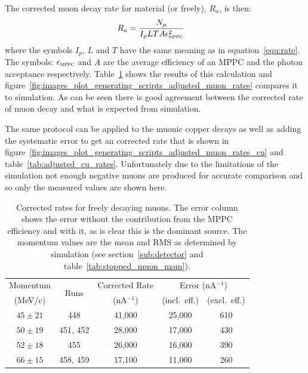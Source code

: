The corrected muon decay rate for material (or freely), \( R_a \), is then:
\begin{align}
    R_a &= \frac{N_{\mu}}{I_p L T A \epsilon_{\textsc{mppc}}^2 } \label{equ:adj_rate}
\end{align}
where the symbols \(I_p\), \(L\) and \(T\) have the same meaning as in equation~\eqref{equ:rate}. The symbols:  \(\epsilon_{\textsc{mppc}}\) and \( A \) are the average efficiency of an MPPC and the photon acceptance respectively. Table~\ref{tab:adjusted_free_decay_rates} shows the results of this calculation and figure~\ref{fig:images_plot_generating_scripts_adjusted_muon_rates} compares it to simulation. As can be seen there is good agreement between the corrected rate of muon decay and what is expected from simulation.

The same protocol can be applied to the muonic copper decays as well as adding the systematic error to get an corrected rate that is shown in figure~\ref{fig:images_plot_generating_scripts_adjusted_muon_rates_cu} and table~\ref{tab:adjusted_cu_rates}. Unfortunately due to the limitations of the simulation not enough negative muons are produced for accurate comparison and so only the measured values are shown here.


\begin{table}
  \lineup %
  \begin{center}
  \begin{tabular}{c | c | c | c | c}
    Momentum       & \multirow{2}{*}{Runs}  &  Corrected Rate  &  \multicolumn{2}{c}{Error (nA\(^{-1}\))} \\
     (MeV/c)       &                        &  (nA\(^{-1}\))   &     (incl.\ eff.)  &  (excl.\ eff.)      \\
    \hline
    \(45 \pm 21\)  &       448              &  41,000          &  25,000            &  610  \\
    \(50 \pm 19\)  &  451, 452              &  28,000          &  17,000            &  430  \\
    \(52 \pm 18\)  &       455              &  26,000          &  16,000            &  390  \\
    \(66 \pm 15\)  &  458, 459              &  17,100          &  11,000            &  260  \\
  \end{tabular}
  \end{center}
  \caption{Corrected rates for freely decaying muons. The error column shows the error without the contribution from the MPPC efficiency and with it, as is clear this is the dominant source. The momentum values are the mean and RMS as determined by simulation (see section~\ref{sub:detector} and table~\ref{tab:stopped_muon_mom}).}
  \label{tab:adjusted_free_decay_rates}
\end{table}

